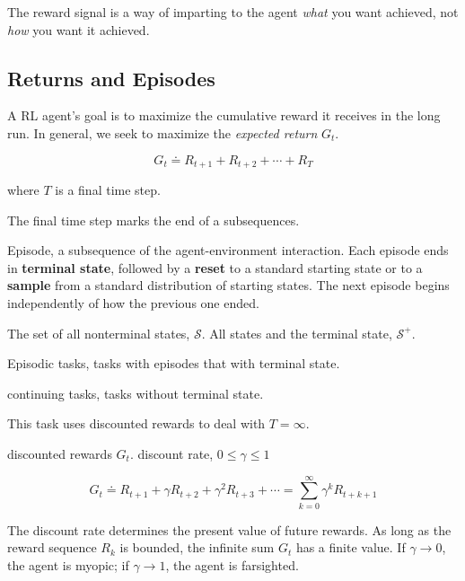 \documentclass[lang=en,mode=geye,device=normal,color=blue,14pt]{elegantnote}
\DeclareMathOperator*{\1}{\mathbbm{1}}
\begin{document}
 The reward signal is a way of imparting to the agent \textit{what} you want achieved, not \textit{how} you want it achieved.

\subsection{Returns and Episodes}

A RL agent's goal is to maximize the cumulative reward it receives in the long run.
In general, we seek to maximize the \textit{expected return} $G_t$.

$$ G_t \doteq R_{t+1} + R_{t+2} + \cdots + R_T $$

where $T$ is a final time step.

The final time step marks the end of a subsequences.

\begin{definition}
Episode, a subsequence of the agent-environment interaction. Each episode ends in \textbf{terminal state}, followed by a \textbf{reset} to a standard starting state or to a \textbf{sample} from a standard distribution of starting states. The next episode begins independently of how the previous one ended.
\end{definition}

The set of all nonterminal states, $\mathcal{S}$. All states and the terminal state, $\mathcal{S^+}$.

\begin{definition}
Episodic tasks, tasks with episodes that with terminal state.
\end{definition}

\begin{definition}
continuing tasks, tasks without terminal state.
\end{definition}

This task uses discounted rewards to deal with $T=\infty$.

\begin{definition}
discounted rewards $G_t$. discount rate, $0 \leq \gamma \leq 1$

$$ G_t \doteq R_{t+1} + \gamma R_{t+2} + \gamma^2 R_{t+3} + \cdots = \sum_{k=0}^{\infty} \gamma^k R_{t+k+1} $$
\end{definition}

The discount rate determines the present value of future rewards. As long as the reward sequence {$R_k$} is bounded, the infinite sum $G_t$ has a finite value.
If $\gamma \rightarrow 0$, the agent is myopic; if $\gamma \rightarrow 1$, the agent is farsighted.
\end{document}
